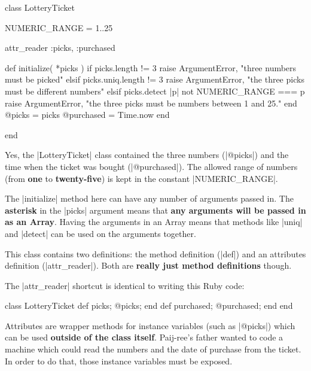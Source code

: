 \documentclass[12pt,twoside]{report}
\begin{document}
\begin{rubycode}

 class LotteryTicket

   NUMERIC_RANGE = 1..25

   attr_reader :picks, :purchased

   def initialize( *picks )
     if picks.length != 3
       raise ArgumentError, "three numbers must be picked"
     elsif picks.uniq.length != 3
       raise ArgumentError, "the three picks must be different numbers"
     elsif picks.detect { |p| not NUMERIC_RANGE === p }
       raise ArgumentError, "the three picks must be numbers between 1 and 25."
     end
     @picks = picks
     @purchased = Time.now
   end

 end

\end{rubycode}


Yes, the \rubyinline|LotteryTicket| class contained
the three numbers (\rubyinline|@picks|) and the time
when the ticket was bought (\rubyinline|@purchased|).
The allowed range of numbers (from {\bf one} to {\bf twenty-five}) is
kept in the constant \rubyinline|NUMERIC_RANGE|.

The \rubyinline|initialize| method here can have any
number of arguments passed in.  The {\bf asterisk} in the
\rubyinline|picks| argument means that {\bf any
  arguments will be passed in as an Array}.  Having the arguments in
an Array means that methods like \rubyinline|uniq| and
\rubyinline|detect| can be used on the arguments
together.

This class contains two definitions: the method definition
(\rubyinline|def|) and an attributes definition
(\rubyinline|attr_reader|).  Both are {\bf really just
  method definitions} though.

The \rubyinline|attr_reader| shortcut is identical to
writing this Ruby code:


\begin{rubycode}

 class LotteryTicket
   def picks; @picks; end
   def purchased; @purchased; end
 end

\end{rubycode}


Attributes are wrapper methods for instance variables (such as
\rubyinline|@picks|) which can be used {\bf outside of
  the class itself}.  Paij-ree's father wanted to code a machine which
could read the numbers and the date of purchase from the ticket.  In
order to do that, those instance variables must be exposed.
\end{document}
